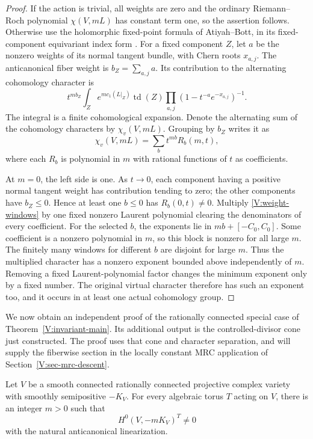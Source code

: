 \begin{proof}
If the action is trivial, all weights are zero and the ordinary
Riemann--Roch polynomial $\chi(V,mL)$ has constant term one, so the
assertion follows.  Otherwise use the holomorphic fixed-point formula
of Atiyah--Bott, in its fixed-component equivariant index form
\cite{AtiyahBott1968,AtiyahSegal1968,AtiyahSinger1968}.
For a fixed component $Z$, let $a$ be the nonzero
weights of its normal tangent bundle, with Chern roots $x_{a,j}$.
The anticanonical fiber weight is $b_Z=\sum_{a,j}a$.  Its contribution
to the alternating cohomology character is
\[
 t^{mb_Z}\int_Z e^{m c_1(L|_Z)}\operatorname{td}(Z)
          \prod_{a,j}(1-t^{-a}e^{-x_{a,j}})^{-1}.
\]
The integral is a finite cohomological expansion.  Denote the alternating
sum of the cohomology characters by $\chi_v(V,mL)$.  Grouping by $b_Z$
writes it as
\begin{equation}\label{V:weight-windows}
 \chi_v(V,mL)=\sum_b t^{mb}R_b(m,t),
\end{equation}
where each $R_b$ is polynomial in $m$ with rational functions of $t$
as coefficients.

At $m=0$, the left side is one.  As $t\to0$, each component having
a positive normal tangent weight has contribution tending to zero;
the other components have $b_Z\le0$.  Hence at least one $b\le0$
has $R_b(0,t)\ne0$.  Multiply \eqref{V:weight-windows} by one fixed
nonzero Laurent polynomial clearing the denominators of every
coefficient.  For the selected $b$, the exponents lie in
$mb+[-C_0,C_0]$.  Some coefficient is a nonzero polynomial in $m$,
so this block is nonzero for all large $m$.  The finitely many windows
for different $b$ are disjoint for large $m$.  Thus the multiplied
character has a nonzero exponent bounded above independently of $m$.
Removing a fixed Laurent-polynomial factor changes the minimum
exponent only by a fixed number.  The original virtual character
therefore has such an exponent too, and it occurs in at least one
actual cohomology group.
\end{proof}

We now obtain an independent proof of the rationally connected
special case of Theorem~\ref{V:invariant-main}. Its additional output
is the controlled-divisor cone just constructed. The proof uses that
cone and character separation, and will supply the fiberwise section
in the locally constant MRC application of Section~\ref{V:sec-mrc-descent}.

\begin{theorem}\label{V:controlled-invariant-nonvanishing}
Let $V$ be a smooth connected rationally connected projective complex
variety with smoothly semipositive $-K_V$.  For every algebraic torus
$T$ acting on $V$, there is an integer $m>0$ such that
\[
 H^0(V,-mK_V)^T\ne0
\]
with the natural anticanonical linearization.
\end{theorem}

